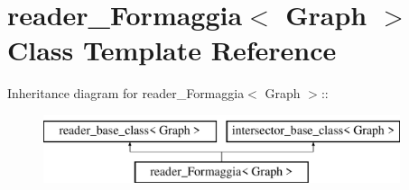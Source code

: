 \hypertarget{classreader__Formaggia}{
\section{reader\_\-Formaggia$<$ Graph $>$ Class Template Reference}
\label{classreader__Formaggia}
}
Inheritance diagram for reader\_\-Formaggia$<$ Graph $>$::\begin{figure}[H]
\begin{center}
\leavevmode
\includegraphics[height=2cm]{classreader__Formaggia}
\end{center}
\end{figure}
